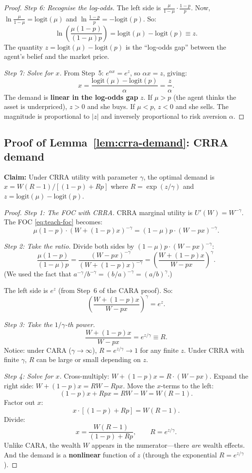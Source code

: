 \documentclass[12pt,letterpaper]{article}
\theoremstyle{definition}
\theoremstyle{remark}
\newcommand{\logit}{\mathrm{logit}}
\newcommand{\1}{\mathbf{1}}
\begin{document}
\begin{proof}
\emph{Step 6: Recognise the log-odds.}
The left side is $\frac{\mu}{1-\mu} \cdot \frac{1-p}{p}$.
Now, $\ln\frac{\mu}{1-\mu} = \logit(\mu)$ and
$\ln\frac{1-p}{p} = -\logit(p)$. So:
\[
   \ln\left(\frac{\mu(1-p)}{(1-\mu)p}\right)
   = \logit(\mu) - \logit(p) \equiv z.
\]
The quantity $z = \logit(\mu) - \logit(p)$ is the ``log-odds gap''
between the agent's belief and the market price.

\emph{Step 7: Solve for $x$.}
From Step~5: $e^{\alpha x} = e^{z}$, so $\alpha x = z$, giving:
\[
   \boxed{x = \frac{\logit(\mu) - \logit(p)}{\alpha} = \frac{z}{\alpha}.}
\]
The demand is \textbf{linear in the log-odds gap} $z$. If $\mu > p$
(the agent thinks the asset is underpriced), $z > 0$ and she buys.
If $\mu < p$, $z < 0$ and she sells. The magnitude is proportional to
$|z|$ and inversely proportional to risk aversion $\alpha$.
\end{proof}

\subsection*{Proof of Lemma~\ref{lem:crra-demand}: CRRA demand}

\textbf{Claim:} Under CRRA utility with parameter $\gamma$, the optimal
demand is $x = W(R-1)/[(1-p) + Rp]$ where
$R = \exp(z/\gamma)$ and $z = \logit(\mu) - \logit(p)$.

\begin{proof}
\emph{Step 1: The FOC with CRRA.}
CRRA marginal utility is $U'(W) = W^{-\gamma}$. The FOC
\eqref{eq:teach-foc} becomes:
\[
   \mu(1-p) \cdot (W + (1-p)x)^{-\gamma}
   = (1-\mu)p \cdot (W - px)^{-\gamma}.
\]

\emph{Step 2: Take the ratio.}
Divide both sides by $(1-\mu)p \cdot (W - px)^{-\gamma}$:
\[
   \frac{\mu(1-p)}{(1-\mu)p}
   = \frac{(W - px)^{-\gamma}}{(W + (1-p)x)^{-\gamma}}
   = \left(\frac{W + (1-p)x}{W - px}\right)^{\gamma}.
\]
(We used the fact that $a^{-\gamma}/b^{-\gamma} = (b/a)^{-\gamma}
= (a/b)^{\gamma}$.)

The left side is $e^{z}$ (from Step~6 of the CARA proof). So:
\[
   \left(\frac{W + (1-p)x}{W - px}\right)^{\gamma} = e^{z}.
\]

\emph{Step 3: Take the $1/\gamma$-th power.}
\[
   \frac{W + (1-p)x}{W - px} = e^{z/\gamma} \equiv R.
\]
Notice: under CARA ($\gamma \to \infty$), $R = e^{z/\gamma} \to 1$
for any finite $z$. Under CRRA with finite $\gamma$, $R$ can be large
or small depending on $z$.

\emph{Step 4: Solve for $x$.}
Cross-multiply: $W + (1-p)x = R \cdot (W - px)$. Expand the right side:
$W + (1-p)x = RW - Rpx$. Move the $x$-terms to the left:
\[
   (1-p)x + Rpx = RW - W = W(R-1).
\]
Factor out $x$:
\[
   x \cdot [(1-p) + Rp] = W(R-1).
\]
Divide:
\[
   \boxed{x = \frac{W(R-1)}{(1-p) + Rp}, \qquad R = e^{z/\gamma}.}
\]
Unlike CARA, the wealth $W$ appears in the numerator---there \emph{are}
wealth effects. And the demand is a \textbf{nonlinear} function of $z$
(through the exponential $R = e^{z/\gamma}$).
\end{proof}
\end{document}
